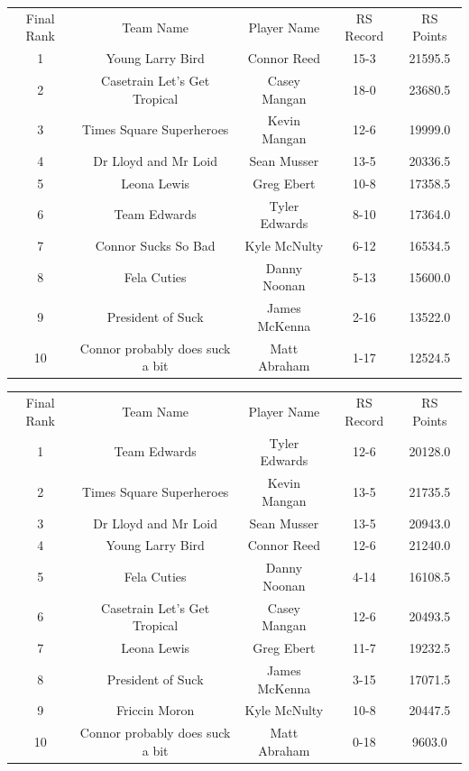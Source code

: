 \documentclass[11pt,letterpaper]{article}
\begin{document}
\vspace{-25pt}
\begin{table} [h]
\begin{center}
\begin{tabular} { c c c c c }
\\ Final Rank & Team Name & Player Name & RS Record & RS Points
\\ 1 & Young Larry Bird & Connor Reed & 15-3 & 21595.5
\\ 2 & Casetrain Let's Get Tropical & Casey Mangan & 18-0 & 23680.5
\\ 3 & Times Square Superheroes & Kevin Mangan & 12-6 & 19999.0
\\ 4 & Dr Lloyd and Mr Loid & Sean Musser & 13-5 & 20336.5
\\ 5 & Leona Lewis & Greg Ebert & 10-8 & 17358.5
\\ 6 & Team Edwards & Tyler Edwards & 8-10 & 17364.0
\\ 7 & Connor Sucks So Bad & Kyle McNulty & 6-12 & 16534.5
\\ 8 & Fela Cuties & Danny Noonan & 5-13 & 15600.0
\\ 9 & President of Suck & James McKenna & 2-16 & 13522.0
\\ 10 & Connor probably does suck a bit & Matt Abraham & 1-17 & 12524.5
\end{tabular}
\end{center}
\end{table}

\newpage
{}
\vspace{-25pt}
\begin{table} [h]
\begin{center}
\begin{tabular} { c c c c c }
\\ Final Rank & Team Name & Player Name & RS Record & RS Points
\\ 1 & Team Edwards & Tyler Edwards & 12-6 & 20128.0
\\ 2 & Times Square Superheroes & Kevin Mangan & 13-5 & 21735.5
\\ 3 & Dr Lloyd and Mr Loid & Sean Musser & 13-5 & 20943.0
\\ 4 & Young Larry Bird & Connor Reed & 12-6 & 21240.0
\\ 5 & Fela Cuties & Danny Noonan & 4-14 & 16108.5
\\ 6 & Casetrain Let's Get Tropical & Casey Mangan & 12-6 & 20493.5
\\ 7 & Leona Lewis & Greg Ebert & 11-7 & 19232.5
\\ 8 & President of Suck & James McKenna & 3-15 & 17071.5
\\ 9 & Friccin Moron & Kyle McNulty & 10-8 & 20447.5
\\ 10 & Connor probably does suck a bit & Matt Abraham & 0-18 & 9603.0
\end{tabular}
\end{center}
\end{table}
\end{document}
